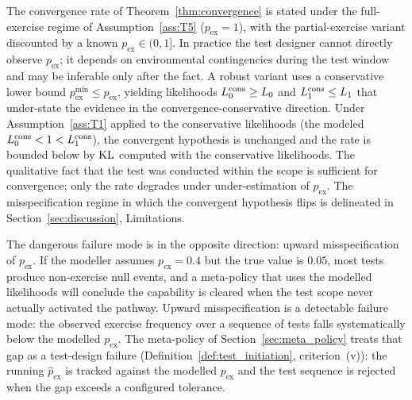 \begin{remark}
\label{rem:pex_robustness}
The convergence rate of Theorem~\ref{thm:convergence} is stated
under the full-exercise regime of Assumption~\ref{ass:T5}
($p_{\mathrm{ex}} = 1$), with the partial-exercise variant
discounted by a known $p_{\mathrm{ex}} \in (0, 1]$.  In practice
the test designer cannot directly observe $p_{\mathrm{ex}}$; it
depends on environmental contingencies during the test window
and may be inferable only after the fact.  A robust variant
uses a conservative lower bound $p_{\mathrm{ex}}^{\min} \leq
p_{\mathrm{ex}}$, yielding likelihoods $L_0^{\mathrm{cons}}
\geq L_0$ and $L_1^{\mathrm{cons}} \leq L_1$ that
under-state the evidence in the convergence-conservative
direction.  Under Assumption~\ref{ass:T1} applied to the
conservative likelihoods (the modeled $L_0^{\mathrm{cons}}
< 1 < L_1^{\mathrm{cons}}$), the convergent hypothesis is
unchanged and the rate is bounded below by $\mathrm{KL}$ computed with
the conservative likelihoods.  The qualitative fact that the
test was conducted within the scope is sufficient for
convergence; only the rate degrades under under-estimation of
$p_{\mathrm{ex}}$.  The misspecification regime in which the
convergent hypothesis flips is delineated in
Section~\ref{sec:discussion}, Limitations.

The dangerous failure mode is in the opposite direction:
upward misspecification of $p_{\mathrm{ex}}$.  If the modeller
assumes $p_{\mathrm{ex}} = 0.4$ but the true value is $0.05$,
most tests produce non-exercise null events, and a meta-policy
that uses the modelled likelihoods will conclude the capability
is cleared when the test scope never actually activated the
pathway.  Upward misspecification is a detectable failure mode: the
observed exercise frequency over a sequence of tests falls
systematically below the modelled $p_{\mathrm{ex}}$.  The
meta-policy of Section~\ref{sec:meta_policy} treats that gap as
a test-design failure (Definition~\ref{def:test_initiation},
criterion~(v)): the running $\hat{p}_{\mathrm{ex}}$ is tracked
against the modelled $p_{\mathrm{ex}}$ and the test sequence is
rejected when the gap exceeds a configured tolerance.
\end{remark}


